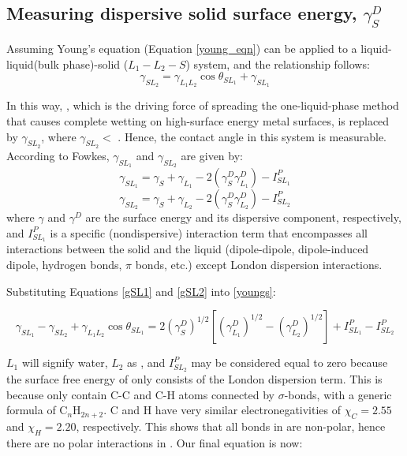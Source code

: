 \subsection{Measuring dispersive solid surface energy, $\gamma_{S}^{D}$}
	
Assuming Young's equation (Equation \ref{young_eqn}) can be applied to a liquid-liquid(bulk phase)-solid ($L_{1}-L_{2}-S$) system, and the relationship follows:
\begin{equation}
\label{youngs}
	\gamma_{SL_{2}} = \gamma_{L_{1}L_{2}}\cos\theta_{SL_{1}} + \gamma_{SL_{1}}
\end{equation}

In this way, \gamSV, which is the driving force of spreading the one-liquid-phase method that causes complete wetting on high-surface energy metal surfaces, is replaced by $ \gamma_{SL_{2}} $, where $\gamma_{SL_{2}} <$ \gamSV. Hence, the contact angle in this system is measurable. According to Fowkes\cite{Fowkes1964}, $\gamma_{SL_{1}}$ and $\gamma_{SL_{2}}$ are given by:
\begin{equation} 
\label{gSL1}
	\gamma_{SL_{1}} = \gamma_{S} + \gamma_{L_{1}} - 2(\gamma_{S}^{D}\gamma_{L_{1}}^{D}) - I_{SL_{1}}^{P}
\end{equation}
\begin{equation}
\label{gSL2}
	\gamma_{SL_{2}} = \gamma_{S} + \gamma_{L_{2}} - 2(\gamma_{S}^{D}\gamma_{L_{2}}^{D}) - I_{SL_{2}}^{P}
\end{equation} 
where $\gamma$ and $\gamma^{D}$ are the surface energy and its dispersive component, respectively, and $I_{SL_{1}}^{P}$ is a specific (nondispersive) interaction term that encompasses all interactions between the solid and the liquid (dipole-dipole, dipole-induced dipole, hydrogen bonds, $\pi$ bonds, etc.) except London dispersion interactions.

Substituting Equations \ref{gSL1} and \ref{gSL2} into \ref{youngs}:

\begin{equation} 
\label{schultz1}
	\gamma_{SL_{1}}-\gamma_{SL_{2}}+\gamma_{L_{1}L_{2}}\cos\theta_{SL_{1}} = 2(\gamma_{S}^{D})^{1/2}  [(\gamma_{L_{1}}^{D})^{1/2}-(\gamma_{L_{2}}^{D})^{1/2}] + I_{SL_{1}}^{P} - I_{SL_{2}}^{P}
\end{equation}

$L_{1}$ will signify water, $L_{2}$ as \nalk[s], and $I_{SL_{2}}^{P}$ may be considered equal to zero because the surface free energy of \nalk[s] only consists of the London dispersion term. This is because \nalk[s] only contain C-C and C-H atoms connected by $\sigma$-bonds, with a generic formula of C$_{n}$H$_{2n+2}$. C and H have very similar electronegativities of $\chi_{C}=2.55$ and $\chi_{H}=2.20$, respectively. This shows that all bonds in \nalk[s] are non-polar, hence there are no polar interactions in \nalk[s]. Our final equation is now:

